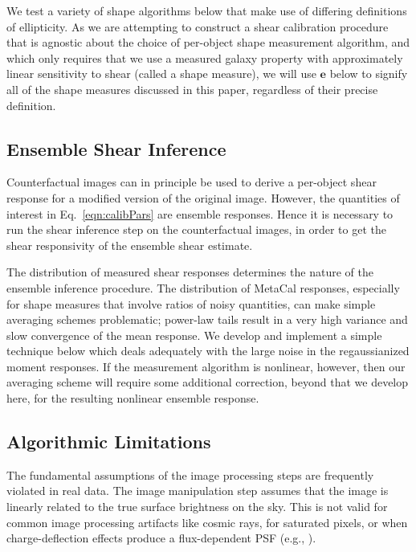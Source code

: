 \documentclass[iop]{emulateapj}
\newcommand\rmcomment[1]{\textcolor{red}{(RM: #1)}}
\begin{document}

We test a variety of shape algorithms below that make use of differing
definitions of ellipticity. As we are attempting to construct a shear
calibration procedure that is agnostic about the choice of per-object
shape measurement algorithm, and which only requires that we use a
measured galaxy property with approximately linear sensitivity to
shear (called a shape measure), we will use $\mathbf{e}$ below to
signify all of the shape measures discussed in this paper, regardless
of their precise definition.

\subsection{Ensemble Shear Inference}
Counterfactual images can in principle be used to derive a per-object
shear response for a modified version of the original image.  However,
the quantities of interest in Eq.~\ref{eqn:calibPars} are ensemble
responses.  Hence it is necessary to run the shear inference
step on the counterfactual images, in order to get the shear
responsivity of the ensemble shear estimate.

The distribution of measured shear responses determines the nature of
the ensemble inference procedure. The distribution of MetaCal
responses, especially for shape measures that involve ratios of noisy
quantities, can make simple averaging schemes problematic; power-law
tails result in a very high variance and slow convergence of the mean
response. We develop and implement a simple technique below which
deals adequately with the large noise in the regaussianized moment
responses. If the measurement algorithm is nonlinear, however, then
our averaging scheme will require some additional correction, beyond
that we develop here, for the resulting nonlinear ensemble response.


\subsection{Algorithmic Limitations}
The fundamental assumptions of the image processing steps are
frequently violated in real data. The image manipulation step assumes
that the image is linearly related to the true surface brightness on
the sky. This is not valid for common image processing artifacts like
cosmic rays, for saturated pixels, or when charge-deflection effects
produce a flux-dependent PSF (e.g.,
\citealt{2015JInst..10C5032G}). 
\end{document}
